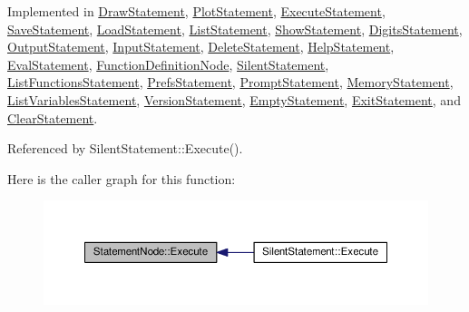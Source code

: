Implemented in \hyperlink{classDrawStatement_af3be5149199ab9940b43ee5a2360ba80}{Draw\+Statement}, \hyperlink{classPlotStatement_a653ff64c2c918b3209be426f7c243459}{Plot\+Statement}, \hyperlink{classExecuteStatement_a8a3bbafeb8739749eab6eaf8a4b9969c}{Execute\+Statement}, \hyperlink{classSaveStatement_ae94aa8533f620634f97b2835cee1eaa2}{Save\+Statement}, \hyperlink{classLoadStatement_ae3cbd157ad8de73551ff430fa3c089d9}{Load\+Statement}, \hyperlink{classListStatement_a49cc9fe49b665a1276f288c069e1c78b}{List\+Statement}, \hyperlink{classShowStatement_a8466ad7e0e61918cda0e399713abb6a8}{Show\+Statement}, \hyperlink{classDigitsStatement_a5a16b621b4759cdc0bf980b01858350b}{Digits\+Statement}, \hyperlink{classOutputStatement_a870c0d2b4bffb94e542d1e5890ec3c20}{Output\+Statement}, \hyperlink{classInputStatement_ac4a9288ba2fe5002ae78d65c270222a5}{Input\+Statement}, \hyperlink{classDeleteStatement_a709e8696c9ca4be32679e6a72b82de86}{Delete\+Statement}, \hyperlink{classHelpStatement_a733d3471c3bcfdd2d07d4766bbdbf6db}{Help\+Statement}, \hyperlink{classEvalStatement_a6d3e0e2db3ed8cbdaa3250bf959a0be7}{Eval\+Statement}, \hyperlink{classFunctionDefinitionNode_af51888496269ad95052794a6898ccc07}{Function\+Definition\+Node}, \hyperlink{classSilentStatement_a8fdf9e3c83dafa43d092282db0bd47b4}{Silent\+Statement}, \hyperlink{classListFunctionsStatement_aecbd17235ded16103ebed33a8fcca90e}{List\+Functions\+Statement}, \hyperlink{classPrefsStatement_ac53922eb842ba389957300fef95cd98f}{Prefs\+Statement}, \hyperlink{classPromptStatement_ad315c8cc58132641e9b8a62902566318}{Prompt\+Statement}, \hyperlink{classMemoryStatement_a0cfd7aae34f2103c7734980907426f4e}{Memory\+Statement}, \hyperlink{classListVariablesStatement_a2ca734439e1c118b8b62d550baac8dc0}{List\+Variables\+Statement}, \hyperlink{classVersionStatement_a0601a810472862583ef4c702c6f1fd0a}{Version\+Statement}, \hyperlink{classEmptyStatement_a5d873e1f5f9b48abe4201319f5e687b0}{Empty\+Statement}, \hyperlink{classExitStatement_a0c7aef922938d7f7f02b8ca402a3bd38}{Exit\+Statement}, and \hyperlink{classClearStatement_ad01255515180fd5271c491386df560a8}{Clear\+Statement}.



Referenced by Silent\+Statement\+::\+Execute().



Here is the caller graph for this function\+:\nopagebreak
\begin{figure}[H]
\begin{center}
\leavevmode
\includegraphics[width=350pt]{classStatementNode_a721589622c930c010927b9a9c55b173e_icgraph}
\end{center}
\end{figure}


